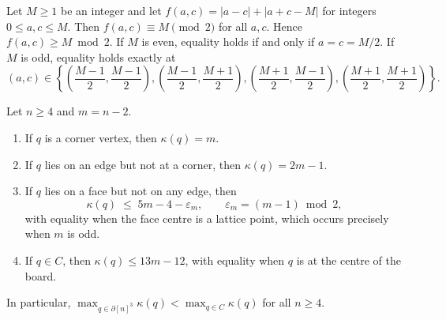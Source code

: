 \documentclass[10pt,a4paper]{amsart}
\begin{document}
\begin{lemma}
\label{lem:parity}
Let $M \geq 1$ be an integer and let $f(a,c) = |a-c| + |a+c-M|$ for integers
$0 \leq a, c \leq M$. Then $f(a,c) \equiv M \pmod{2}$ for all $a, c$. Hence
$f(a,c) \geq M \bmod 2$. If $M$ is even, equality holds if and only if
$a = c = M/2$. If $M$ is odd, equality holds exactly at
\[
(a,c) \in \left\{\left(\frac{M-1}{2},\frac{M-1}{2}\right),
\left(\frac{M-1}{2},\frac{M+1}{2}\right),
\left(\frac{M+1}{2},\frac{M-1}{2}\right),
\left(\frac{M+1}{2},\frac{M+1}{2}\right)\right\}.
\]
\end{lemma}

\begin{theorem}
\label{thm:orbit}
Let $n \geq 4$ and $m = n-2$.
\begin{enumerate}
  \item[\textnormal{(i)}] If $q$ is a corner vertex, then $\kappa(q) = m$.
  \item[\textnormal{(ii)}] If $q$ lies on an edge but not at a corner, then
        $\kappa(q) = 2m-1$.
  \item[\textnormal{(iii)}] If $q$ lies on a face but not on any edge, then
        \[
          \kappa(q) \;\leq\; 5m - 4 - \varepsilon_m,
          \qquad \varepsilon_m = (m-1)\bmod 2,
        \]
        with equality when the face centre is a lattice point, which occurs
        precisely when $m$ is odd.
  \item[\textnormal{(iv)}] If $q \in C$, then $\kappa(q) \leq 13m-12$, with
        equality when $q$ is at the centre of the board.
\end{enumerate}
In particular, $\max_{q\in\partial[n]^3}\kappa(q) < \max_{q\in C}\kappa(q)$
for all $n \geq 4$.
\end{theorem}
\end{document}

